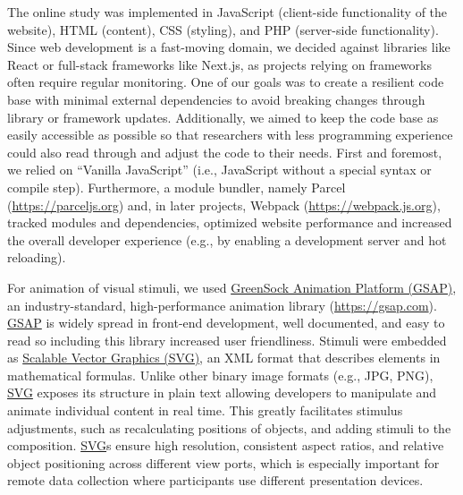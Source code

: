 \documentclass[
]{scrbook}
\begin{document}
The online study was implemented in JavaScript (client-side functionality of the website), HTML (content), CSS (styling), and PHP (server-side functionality). Since web development is a fast-moving domain, we decided against libraries like React or full-stack frameworks like Next.js, as projects relying on frameworks often require regular monitoring. One of our goals was to create a resilient code base with minimal external dependencies to avoid breaking changes through library or framework updates. Additionally, we aimed to keep the code base as easily accessible as possible so that researchers with less programming experience could also read through and adjust the code to their needs. First and foremost, we relied on ``Vanilla JavaScript'' (i.e., JavaScript without a special syntax or compile step). Furthermore, a module bundler, namely Parcel (\mbox{\url{https://parceljs.org}}) and, in later projects, Webpack (\mbox{\url{https://webpack.js.org}}), tracked modules and dependencies, optimized website performance and increased the overall developer experience (e.g., by enabling a development server and hot reloading).

For animation of visual stimuli, we used \hyperref[acronyms_GSAP]{GreenSock Animation Platform (GSAP)}, an industry-standard, high-performance animation library (\mbox{\url{https://gsap.com}}). \hyperref[acronyms_GSAP]{GSAP} is widely spread in front-end development, well documented, and easy to read so including this library increased user friendliness. Stimuli were embedded as \hyperref[acronyms_SVG]{Scalable Vector Graphics (SVG)}, an XML format that describes elements in mathematical formulas. Unlike other binary image formats (e.g., JPG, PNG), \hyperref[acronyms_SVG]{SVG} exposes its structure in plain text allowing developers to manipulate and animate individual content in real time. This greatly facilitates stimulus adjustments, such as recalculating positions of objects, and adding stimuli to the composition. \hyperref[acronyms_SVG]{SVG}s ensure high resolution, consistent aspect ratios, and relative object positioning across different view ports, which is especially important for remote data collection where participants use different presentation devices.
\end{document}
